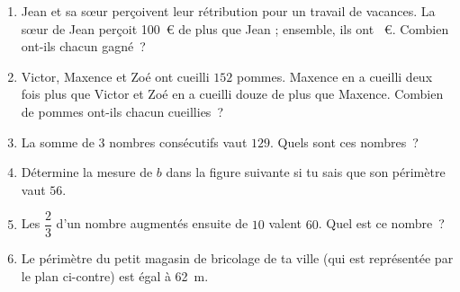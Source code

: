 \documentclass[../../syllabus_2.tex]{subfiles}
\begin{document}
\begin{exercise}
  \begin{enumerate}[itemsep=10cm]
    \item Jean et sa s\oe{}ur perçoivent leur rétribution pour un travail de
          vacances. La s\oe{}ur de Jean perçoit 100~€ de plus que Jean ;
          ensemble, ils ont ~€. Combien ont-ils chacun gagné~?
    \item Victor, Maxence et Zoé ont cueilli $152$ pommes. Maxence en a
          cueilli deux fois plus que Victor et Zoé en a cueilli douze de plus
          que Maxence. Combien de pommes ont-ils chacun cueillies~?
    \newpage
    \item La somme de $3$ nombres consécutifs vaut $129$. Quels sont ces
          nombres~?
    \item Détermine la mesure de $b$ dans la figure suivante si tu sais que son
          périmètre vaut $56$.
          \begin{center}
            
          \end{center}
    \newpage
    \item Les $\dfrac{2}{3}$ d'un nombre augmentés ensuite de $10$ valent $60$.
          Quel est ce nombre~?
    \item Le périmètre du petit magasin de bricolage de ta ville (qui est
          représentée par le plan ci-contre) est égal à \SI{62}{m}.
          \begin{center}
            
          \end{center}
  \end{enumerate}
\end{exercise}

\newpage
\end{document}
